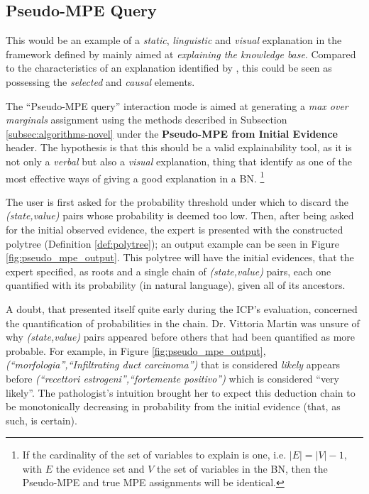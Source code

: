 \subsection{Pseudo-MPE Query} \label{subsec:results-pseudo-mpe-query}
This would be an example of a \textit{static}, \textit{linguistic} and \textit{visual} explanation in the framework defined by \citet{lacave2002review} mainly aimed at \textit{explaining the knowledge base}.
Compared to the characteristics of an explanation identified by \citet{miller2018explanation}, this could be seen as possessing the \textit{selected} and \textit{causal} elements.

The \enquote{Pseudo-MPE query} interaction mode is aimed at generating a \textit{max over marginals} assignment using the methods described in Subsection \ref{subsec:algorithms-novel} under the \textbf{Pseudo-MPE from Initial Evidence} header.
The hypothesis is that this should be a valid explainability tool, as it is not only a \textit{verbal} but also a \textit{visual} explanation, thing that \citet{lacave2002review} identify as one of the most effective ways of giving a good explanation in a BN.
\footnote{If the cardinality of the set of variables to explain is one, i.e. $|E| = |V|-1$, with $E$ the evidence set and $V$ the set of variables in the BN, then the Pseudo-MPE and true MPE assignments will be identical.}

The user is first asked for the probability threshold under which to discard the \textit{(state,value)} pairs whose probability is deemed too low.
Then, after being asked for the initial observed evidence, the expert is presented with the constructed polytree (Definition \ref{def:polytree}); an output example can be seen in Figure \ref{fig:pseudo_mpe_output}.
This polytree will have the initial evidences, that the expert specified, as roots and a single chain of \textit{(state,value)} pairs, each one quantified with its probability (in natural language), given all of its ancestors.

A doubt, that presented itself quite early during the ICP's evaluation, concerned the quantification of probabilities in the chain.
Dr. Vittoria Martin was unsure of why \textit{(state,value)} pairs appeared before others  that had been quantified as more probable.
For example, in Figure \ref{fig:pseudo_mpe_output}, \textit{(\enquote{morfologia},\enquote{Infiltrating duct carcinoma})} that is considered \textit{likely} appears before \textit{(\enquote{recettori estrogeni},\enquote{fortemente positivo})} which is considered \enquote{very likely}.
The pathologist's intuition brought her to expect this deduction chain to be monotonically decreasing in probability from the initial evidence (that, as such, is certain).

